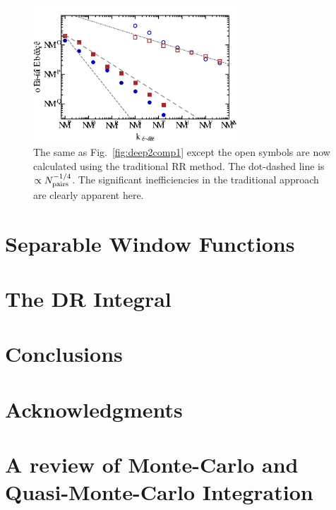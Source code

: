\documentclass[usenatbib]{mn2e}
\begin{document}
\begin{figure}
\includegraphics[width=3in]{plots/deep2rrcomp2}
\caption{The same as Fig.~\ref{fig:deep2comp1} except the open symbols are now
calculated using the traditional RR method. The dot-dashed line is $\propto
N_{\rm pairs}^{-1/4}$. The significant inefficiencies in the traditional
approach are clearly apparent here. }
\label{fig:deep2comp2}
\end{figure}



\section{Separable Window Functions}
\label{sec:sep}

\section{The DR Integral}
\label{sec:DR}

\section{Conclusions}
\label{sec:conclude}


\section{Acknowledgments}

\appendix

\section{A review of Monte-Carlo and Quasi-Monte-Carlo Integration}
\label{sec:review}
\end{document}
